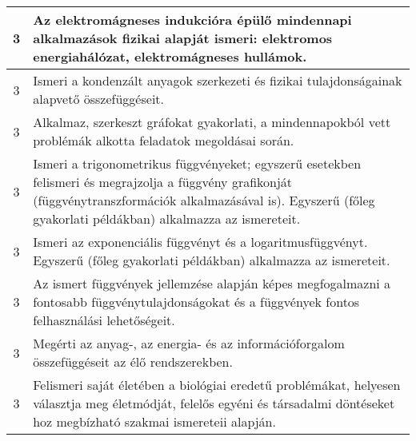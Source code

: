 \begin{longtable}{c | p{12cm} }
                                
                                          3 &  Az elektromágneses indukcióra épülő mindennapi alkalmazások fizikai alapját ismeri: elektromos energiahálózat, elektromágneses hullámok. \\ \hline
                                          3 &  Ismeri a kondenzált anyagok szerkezeti és fizikai tulajdonságainak alapvető összefüggéseit. \\ \hline
                                          3 &  Alkalmaz, szerkeszt gráfokat gyakorlati, a mindennapokból vett problémák alkotta feladatok megoldásai során. \\ \hline
                                          3 &  Ismeri a trigonometrikus függvényeket; egyszerű esetekben felismeri és megrajzolja a függvény grafikonját (függvénytranszformációk alkalmazásával is). Egyszerű (főleg gyakorlati példákban) alkalmazza az ismereteit. \\ \hline
                                          3 &  Ismeri az exponenciális függvényt és a logaritmusfüggvényt. Egyszerű (főleg gyakorlati példákban) alkalmazza az ismereteit. \\ \hline
                                          3 &  Az ismert függvények jellemzése alapján képes megfogalmazni a fontosabb függvénytulajdonságokat és a függvények fontos felhasználási lehetőségeit. \\ \hline
                                          3 &  Megérti az anyag-, az energia- és az információforgalom összefüggéseit az élő rendszerekben. \\ \hline
                                          3 &  Felismeri saját életében a biológiai eredetű problémákat, helyesen választja meg életmódját, felelős egyéni és társadalmi döntéseket hoz megbízható szakmai ismereteii alapján. \\ \hline
                                      

\end{longtable}
